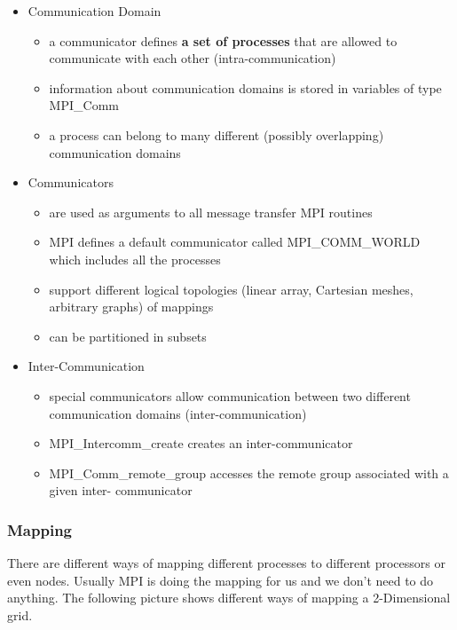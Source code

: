 \begin{itemize}
\tightlist
\item
  Communication Domain

  \begin{itemize}
  \tightlist
  \item
    a communicator defines \textbf{a set of processes} that are allowed
    to communicate with each other (intra-communication)
  \item
    information about communication domains is stored in variables of
    type MPI\_Comm
  \item
    a process can belong to many different (possibly overlapping)
    communication domains
  \end{itemize}
\item
  Communicators

  \begin{itemize}
  \tightlist
  \item
    are used as arguments to all message transfer MPI routines
  \item
    MPI defines a default communicator called MPI\_COMM\_WORLD which
    includes all the processes
  \item
    support different logical topologies (linear array, Cartesian
    meshes, arbitrary graphs) of mappings
  \item
    can be partitioned in subsets
  \end{itemize}
\item
  Inter-Communication

  \begin{itemize}
  \tightlist
  \item
    special communicators allow communication between two different
    communication domains (inter-communication)
  \item
    MPI\_Intercomm\_create creates an inter-communicator
  \item
    MPI\_Comm\_remote\_group accesses the remote group associated with a
    given inter- communicator
  \end{itemize}
\end{itemize}

\hypertarget{mapping}{%
\subsubsection{Mapping}\label{mapping}}

There are different ways of mapping different processes to different
processors or even nodes. Usually MPI is doing the mapping for us and we
don't need to do anything. The following picture shows different ways of
mapping a 2-Dimensional grid.

